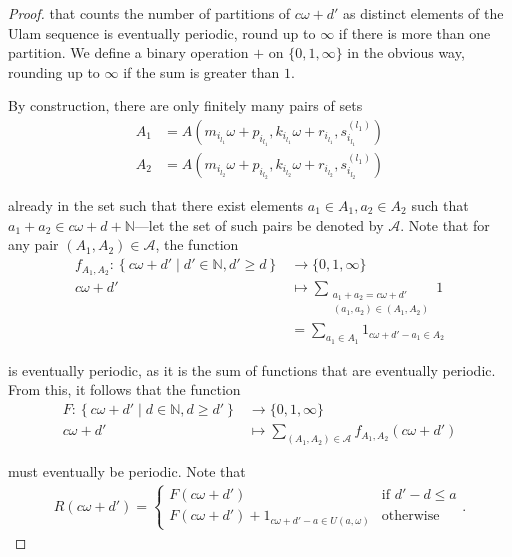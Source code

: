 \documentclass{amsart}
\newcommand{\NN}{\mathbb{N}}
\theoremstyle{theorem}
\theoremstyle{definition}
\begin{document}
\begin{proof}
\noindent that counts the number of partitions of $c\omega + d'$ as distinct elements of the Ulam sequence is eventually periodic, round up to $\infty$ if there is more than one partition. We define a binary operation $+$ on $\{0,1,\infty\}$ in the obvious way, rounding up to $\infty$ if the sum is greater than $1$.
	
By construction, there are only finitely many pairs of sets
	\begin{align*}
	A_1 &= A\left(m_{i_{l_1}}\omega + p_{i_{l_1}}, k_{i_{l_1}}\omega + r_{i_{l_1}},s^{(l_1)}_{i_{l_1}}\right) \\
	A_2 &= A\left(m_{i_{l_2}}\omega + p_{i_{l_2}}, k_{i_{l_2}}\omega + r_{i_{l_2}},s^{(l_1)}_{i_{l_2}}\right)
	\end{align*}
		
\noindent already in the set such that there exist elements $a_1 \in A_1, a_2 \in A_2$ such that $a_1 + a_2 \in c\omega + d + \NN$---let the set of such pairs be denoted by $\mathcal{A}$. Note that for any pair $(A_1, A_2) \in \mathcal{A}$, the function
	\begin{align*}
	f_{A_1,A_2}: \left\{c\omega + d' \middle| d' \in \NN, d' \geq d\right\} &\rightarrow \{0,1,\infty\} \\
	c\omega + d' &\mapsto \sum_{\substack{a_1 + a_2 = c\omega + d' \\ (a_1,a_2) \in (A_1,A_2)}} 1 \\
	&= \sum_{a_1 \in A_1} 1_{c\omega + d' - a_1 \in A_2}
	\end{align*}
		
\noindent is eventually periodic, as it is the sum of functions that are eventually periodic. From this, it follows that the function
	\begin{align*}
	F: \left\{c\omega + d' \middle| d \in \NN, d \geq d'\right\} &\rightarrow \{0,1,\infty\} \\
	c\omega + d' &\mapsto \sum_{(A_1, A_2) \in \mathcal{A}} f_{A_1, A_2}(c\omega + d')
	\end{align*}
		
\noindent must eventually be periodic. Note that
	\begin{align*}
	R(c\omega + d') = \begin{cases} F(c\omega + d') & \text{if } d' - d \leq a \\ F(c\omega + d') + 1_{c\omega + d' - a \in U(a,\omega)} & \text{otherwise} \end{cases}.
	\end{align*}
		

\end{proof}
\end{document}
